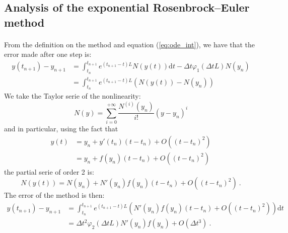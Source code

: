     \subsection{Analysis of the exponential Rosenbrock--Euler method}

      \paragraph{}
      From the definition on the method and equation (\ref{eq:ode_int}), we have that the error made after one step is:
      \begin{equation}
        \begin{aligned}
          y\left(t_{n+1}\right) - y_{n+1} &= \int_{t_n}^{t_{n+1}} e^{\left(t_{n+1} - t\right) L} N\left(y\left(t\right)\right) \mathrm{d}t  - \Delta t \varphi_1\left(\Delta t L\right) N\left(y_n\right) \\
          &= \int_{t_n}^{t_{n+1}} e^{\left(t_{n+1} - t\right) L} \left( N\left(y\left(t\right)\right) - N\left(y_n\right) \right)
        \end{aligned}
      \end{equation}
      We take the Taylor serie of the nonlinearity:
      \begin{equation}
        N\left(y\right) = \sum_{i = 0}^{+\infty} \frac{N^{\left(i\right)}\left(y_n\right)}{i!}\left(y - y_n\right)^i
      \end{equation}
      and in particular, using the fact that
      \begin{equation}
        \begin{aligned}
          y\left(t\right) &= y_n + y'\left(t_n\right)\left(t - t_n\right) + O\left(\left(t - t_n\right)^2\right) \\
          & = y_n + f\left(y_n\right)\left(t - t_n\right) + O\left(\left(t - t_n\right)^2\right)
        \end{aligned}
      \end{equation}
      the partial serie of order 2 is:
      \begin{equation}
        N\left(y\left(t\right)\right) = N\left(y_n\right) + N'\left(y_n\right)f\left(y_n\right)\left(t - t_n\right) + O\left(\left(t - t_n\right)^2\right) \ .
      \end{equation}
      The error of the method is then:
      \begin{equation}
        \begin{aligned}
          y\left(t_{n+1}\right) - y_{n+1} &= \int_{t_n}^{t_{n+1}} e^{\left(t_{n+1} - t\right) L} \left( N'\left(y_n\right)f\left(y_n\right)\left(t - t_n\right) + O\left(\left(t - t_n\right)^2\right) \right) \mathrm{d}t \\
          &= \Delta t^2\varphi_2\left(\Delta t L\right) N'\left(y_n\right)f\left(y_n\right) + O\left(\Delta t^3\right) \ .
        \end{aligned}
      \end{equation}
